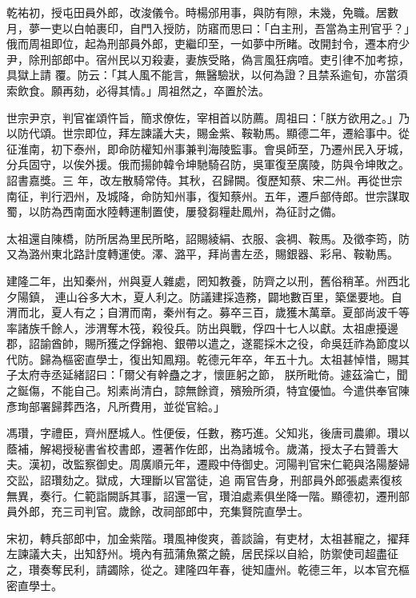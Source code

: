 \begin{pinyinscope}
 乾祐初，授屯田員外郎，改浚儀令。時楊邠用事，與防有隙，未幾，免職。居數月，夢一吏以白帕裹印，自門入授防，防寤而思曰：「白主刑，吾當為主刑官乎？」俄而周祖即位，起為刑部員外郎，吏繼印至，一如夢中所睹。改開封令，遷本府少尹，除刑部郎中。宿州民以刃殺妻，妻族受賂，偽言風狂病喑。吏引律不加考掠，具獄上請
 覆。防云：「其人風不能言，無醫驗狀，以何為證？且禁系逾旬，亦當須索飲食。願再劾，必得其情。」周祖然之，卒置於法。



 世宗尹京，判官崔頌忤旨，簡求僚佐，宰相首以防薦。周祖曰：「朕方欲用之。」乃以防代頌。世宗即位，拜左諫議大夫，賜金紫、鞍勒馬。顯德二年，遷給事中。從征淮南，初下泰州，即命防權知州事兼判海陵監事。會吳師至，乃遷州民入牙城，分兵固守，以俟外援。俄而揚帥韓令坤馳騎召防，吳軍復至廣陵，防與令坤敗之。詔書嘉獎。三
 年，改左散騎常侍。其秋，召歸闕。復歷知蔡、宋二州。再從世宗南征，判行泗州，及城降，命防知州事，復知蔡州。五年，遷戶部侍郎。世宗謀取蜀，以防為西南面水陸轉運制置使，屢發芻糧赴鳳州，為征討之備。



 太祖還自陳橋，防所居為里民所略，詔賜綾絹、衣服、衾裯、鞍馬。及徵李筠，防又為潞州東北路計度轉運使。澤、潞平，拜尚書左丞，賜銀器、彩帛、鞍勒馬。



 建隆二年，出知秦州，州與夏人雜處，罔知教養，防齊之以刑，舊俗稍革。州西北夕陽鎮，
 連山谷多大木，夏人利之。防議建採造務，闢地數百里，築堡要地。自渭而北，夏人有之；自渭而南，秦州有之。募卒三百，歲獲木萬章。夏部尚波千等率諸族千餘人，涉渭奪木筏，殺役兵。防出與戰，俘四十七人以獻。太祖慮擾邊郡，詔諭酋帥，賜所獲之俘錦袍、銀帶以遣之，遂罷採木之役，命吳廷祚為節度以代防。歸為樞密直學士，復出知鳳翔。乾德元年卒，年五十九。太祖甚悼惜，賜其子太府寺丞延緒詔曰：「爾父有幹蠱之才，懷匪躬之節，
 朕所毗倚。遽茲淪亡，聞之鋋傷，不能自己。矧素尚清白，諒無餘資，殯殮所須，特宜優恤。今遣供奉官陳彥珣部署歸葬西洛，凡所費用，並從官給。」



 馮瓚，字禮臣，齊州歷城人。性便佞，任數，務巧進。父知兆，後唐司農卿。瓚以蔭補，解褐授秘書省校書郎，遷著作佐郎，出為諸城令。歲滿，授太子右贊善大夫。漢初，改監察御史。周廣順元年，遷殿中侍御史。河陽判官宋仁範與洛陽嫠婦交訟，詔瓚劾之。獄成，大理斷以官當徒，追
 兩官告身，刑部員外郎張處素復核無異，奏行。仁範詣闕訴其事，詔還一官，瓚洎處素俱坐降一階。顯德初，遷刑部員外郎，充三司判官。歲餘，改祠部郎中，充集賢院直學士。



 宋初，轉兵部郎中，加金紫階。瓚風神俊爽，善談論，有吏材，太祖甚寵之，擢拜左諫議大夫，出知舒州。境內有菰蒲魚鱉之饒，居民採以自給，防禦使司超盡征之，瓚奏奪民利，請蠲除，從之。建隆四年春，徙知廬州。乾德三年，以本官充樞密直學士。




\end{pinyinscope}
